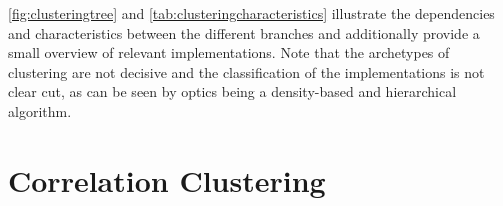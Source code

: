 
\autoref{fig:clusteringtree} and \autoref{tab:clusteringcharacteristics} illustrate the dependencies and characteristics between the different branches and additionally provide a small overview of relevant implementations. Note that the archetypes of clustering are not decisive and the classification of the implementations is not clear cut, as can be seen by \acrshort{optics} being a density-based and hierarchical algorithm. 


\break
\section{Correlation Clustering}\label{sec:subspaceclu}

